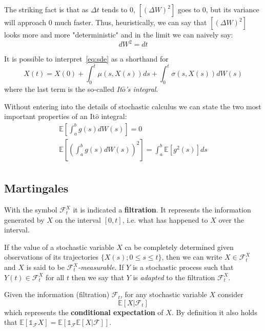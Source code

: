 \documentclass[12pt,a4paper]{article}
\begin{document}
The striking fact is that as $\Delta t$ tends to 0, $[(\Delta W)^2]$ goes to 0, but its variance will approach 0 much faster.
Thus, heuristically, we can say that $[(\Delta W)^2]$ looks more and more "deterministic" and in the limit we can naively say:
\begin{equation*}
\boxed{dW^2 = dt}
\end{equation*}

It is possible to interpret~\ref{eq:sde} as a shorthand for 
\begin{equation*}
X(t) = X(0) + \int_0^t \mu(s,X(s)) ds + \int_0^t \sigma(s,X(s)) dW(s)
\end{equation*}
where the last term is the so-called \emph{It$\hat{o}$'s integral}.

Without entering into the details of stochastic calculus we can state the two most important properties of an It$\hat{o}$ integral:
\begin{equation*}
\begin{gathered}
\mathbb{E}\left[\int_a^b g(s) dW(s)\right] = 0 \\
\mathbb{E}\left[\left(\int_a^b g(s) dW(s)\right)^2\right] = \int_a^b\mathbb{E}[g^2(s)]ds\\
\end{gathered}
\end{equation*}

\subsection{Martingales}
With the symbol $\mathcal{F}^X_t$ it is indicated a \textbf{filtration}. It represents the information generated by $X$ on the interval $[0, t]$, i.e. what has happened to $X$ over the interval. 

If the value of a stochastic variable $X$ ca be completely determined given observations of its trajectories $\{X(s); 0\leq s \leq t\}$, then we can write $X\in\mathcal{F}_t^X$ and $X$ is said to be $\mathcal{F}_t^X$\emph{-measurable}.
If $Y$ is a stochastic process such that $Y(t)\in\mathcal{F}_t^X$ for all $t$ then we say that $Y$ is \emph{adapted} to the filtration $\mathcal{F}_t^X$. 

Given the information (filtration) $\mathcal{F}_t$, for any stochastic variable $X$ consider
\begin{equation*}
	\mathbb{E}[X|\mathcal{F}_t]
\end{equation*}
which represents the \textbf{conditional expectation} of $X$.
By definition it also holds that $\mathbb{E}[\mathbb{1}_{\mathcal{F}}X] = \mathbb{E}[\mathbb{1}_{\mathcal{F}}\mathbb{E}[X|\mathcal{F}]]$.
\end{document}
